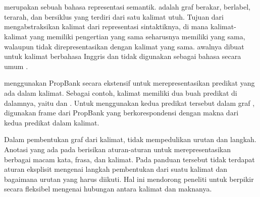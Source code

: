\section{}

\AMR{} merupakan sebuah bahasa representasi semantik.
\AMR{} adalah graf berakar, berlabel, terarah, dan bersiklus yang terdiri dari satu kalimat utuh.
Tujuan dari \AMR{} mengabstraksikan kalimat dari representasi sintaktiknya, di mana kalimat-kalimat yang memiliki pengertian yang sama seharusnya memiliki \AMR{} yang sama, walaupun tidak direpresentasikan dengan kalimat yang sama.
\AMR{} awalnya dibuat untuk kalimat berbahasa Inggris dan tidak digunakan sebagai bahasa secara umum .

\AMR{} menggunakan  PropBank  secara ekstensif untuk merepresentasikan predikat yang ada dalam kalimat.
Sebagai contoh, kalimat  memiliki dua buah predikat di dalamnya, yaitu  dan .
Untuk menggunakan kedua predikat tersebut dalam graf \AMR{}, digunakan frame dari PropBank yang berkorespondensi dengan makna dari kedua predikat dalam kalimat.

Dalam pembentukan graf dari kalimat, \AMR{} tidak mempedulikan urutan dan langkah.
Anotasi yang ada pada \AMR{} berisikan aturan-aturan untuk merepresentasikan berbagai macam kata, frasa, dan kalimat.
Pada panduan tersebut tidak terdapat aturan eksplisit mengenai langkah pembentukan \AMR{} dari suatu kalimat dan bagaimana urutan yang harus diikuti.
Hal ini mendorong peneliti untuk berpikir secara fleksibel mengenai hubungan antara kalimat dan maknanya.

